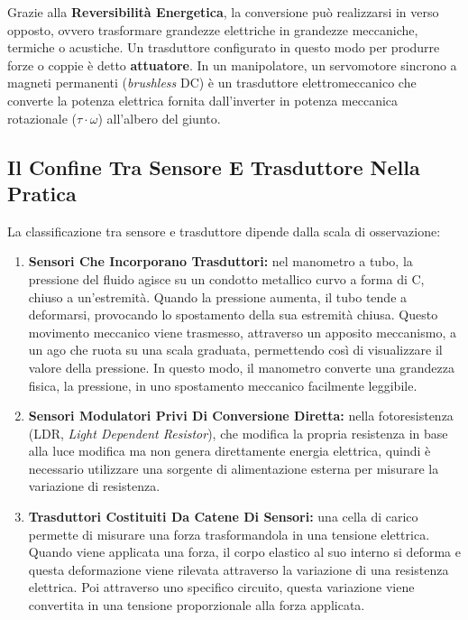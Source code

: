 ﻿\documentclass[11pt, a4paper]{article}
\begin{document}
Grazie alla \textbf{Reversibilità Energetica}, la conversione può realizzarsi in verso opposto, ovvero trasformare grandezze elettriche in grandezze meccaniche, termiche o acustiche. Un trasduttore configurato in questo modo per produrre forze o coppie è detto \textbf{attuatore}. In un manipolatore, un servomotore sincrono a magneti permanenti (\textit{brushless} DC) è un trasduttore elettromeccanico che converte la potenza elettrica fornita dall'inverter in potenza meccanica rotazionale ($\tau \cdot \omega$) all'albero del giunto.

\subsection{Il Confine Tra Sensore E Trasduttore Nella Pratica}

La classificazione tra sensore e trasduttore dipende dalla scala di osservazione:
\begin{enumerate}
    \item \textbf{Sensori Che Incorporano Trasduttori:} nel manometro a tubo, la pressione del fluido agisce su un condotto metallico curvo a forma di C, chiuso a un'estremità. Quando la pressione aumenta, il tubo tende a deformarsi, provocando lo spostamento della sua estremità chiusa. Questo movimento meccanico viene trasmesso, attraverso un apposito meccanismo, a un ago che ruota su una scala graduata, permettendo così di visualizzare il valore della pressione. In questo modo, il manometro converte una grandezza fisica, la pressione, in uno spostamento meccanico facilmente leggibile.

    \item \textbf{Sensori Modulatori Privi Di Conversione Diretta:} nella fotoresistenza (LDR, \textit{Light Dependent Resistor}), che modifica la propria resistenza in base alla luce modifica ma non genera direttamente energia elettrica, quindi è necessario utilizzare una sorgente di alimentazione esterna per misurare la variazione di resistenza.

    \item \textbf{Trasduttori Costituiti Da Catene Di Sensori:} una cella di carico permette di misurare una forza trasformandola in una tensione elettrica. Quando viene applicata una forza, il corpo elastico al suo interno si deforma e questa deformazione viene rilevata attraverso la variazione di una resistenza elettrica. Poi attraverso uno specifico circuito, questa variazione viene convertita in una tensione proporzionale alla forza applicata.
\end{enumerate}
\newpage
\end{document}
